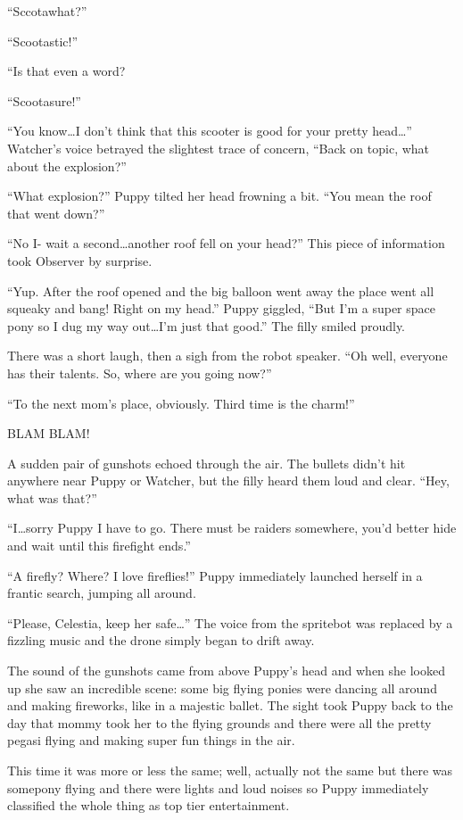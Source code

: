 ``Sccotawhat?''

``Scootastic!''

``Is that even a word?

``Scootasure!''

``You know\dots I don't think that this scooter is good for your pretty head\dots'' Watcher's voice betrayed the slightest trace of concern, ``Back on topic, what about the explosion?''

``What explosion?'' Puppy tilted her head frowning a bit. ``You mean the roof that went down?''

``No I- wait a second\dots another roof fell on your head?'' This piece of information took Observer by surprise.

``Yup. After the roof opened and the big balloon went away the place went all squeaky and bang! Right on my head.'' Puppy giggled, ``But I'm a super space pony so I dug my way out\dots I'm just that good.'' The filly smiled proudly.

There was a short laugh, then a sigh from the robot speaker. ``Oh well, everyone has their talents. So, where are you going now?''

``To the next mom's place, obviously. Third time is the charm!''

BLAM BLAM!

A sudden pair of gunshots echoed through the air. The bullets didn't hit anywhere near Puppy or Watcher, but the filly heard them loud and clear. ``Hey, what was that?''

``I\dots sorry Puppy I have to go. There must be raiders somewhere, you'd better hide and wait until this firefight ends.''

``A firefly? Where? I love fireflies!'' Puppy immediately launched herself in a frantic search, jumping all around.

``Please, Celestia, keep her safe\dots'' The voice from the spritebot was replaced by a fizzling music and the drone simply began to drift away.

The sound of the gunshots came from above Puppy's head and when she looked up she saw an incredible scene: some big flying ponies were dancing all around and making fireworks, like in a majestic ballet. The sight took Puppy back to the day that mommy took her to the flying grounds and there were all the pretty pegasi flying and making super fun things in the air.

This time it was more or less the same; well, actually not the same but there was somepony flying and there were lights and loud noises so Puppy immediately classified the whole thing as top tier entertainment.


